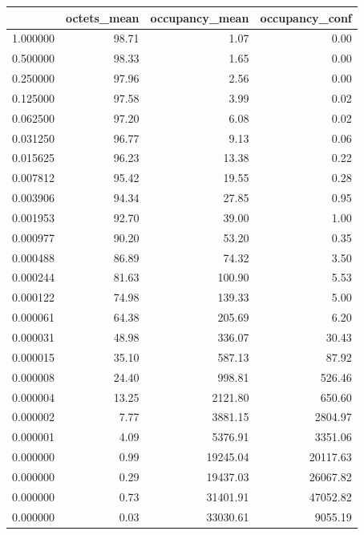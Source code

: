 \begin{tabular}{lrrr}
\toprule
 & octets_mean & occupancy_mean & occupancy_conf \\
\midrule
1.000000 & 98.71 & 1.07 & 0.00 \\
0.500000 & 98.33 & 1.65 & 0.00 \\
0.250000 & 97.96 & 2.56 & 0.00 \\
0.125000 & 97.58 & 3.99 & 0.02 \\
0.062500 & 97.20 & 6.08 & 0.02 \\
0.031250 & 96.77 & 9.13 & 0.06 \\
0.015625 & 96.23 & 13.38 & 0.22 \\
0.007812 & 95.42 & 19.55 & 0.28 \\
0.003906 & 94.34 & 27.85 & 0.95 \\
0.001953 & 92.70 & 39.00 & 1.00 \\
0.000977 & 90.20 & 53.20 & 0.35 \\
0.000488 & 86.89 & 74.32 & 3.50 \\
0.000244 & 81.63 & 100.90 & 5.53 \\
0.000122 & 74.98 & 139.33 & 5.00 \\
0.000061 & 64.38 & 205.69 & 6.20 \\
0.000031 & 48.98 & 336.07 & 30.43 \\
0.000015 & 35.10 & 587.13 & 87.92 \\
0.000008 & 24.40 & 998.81 & 526.46 \\
0.000004 & 13.25 & 2121.80 & 650.60 \\
0.000002 & 7.77 & 3881.15 & 2804.97 \\
0.000001 & 4.09 & 5376.91 & 3351.06 \\
0.000000 & 0.99 & 19245.04 & 20117.63 \\
0.000000 & 0.29 & 19437.03 & 26067.82 \\
0.000000 & 0.73 & 31401.91 & 47052.82 \\
0.000000 & 0.03 & 33030.61 & 9055.19 \\
\bottomrule
\end{tabular}
